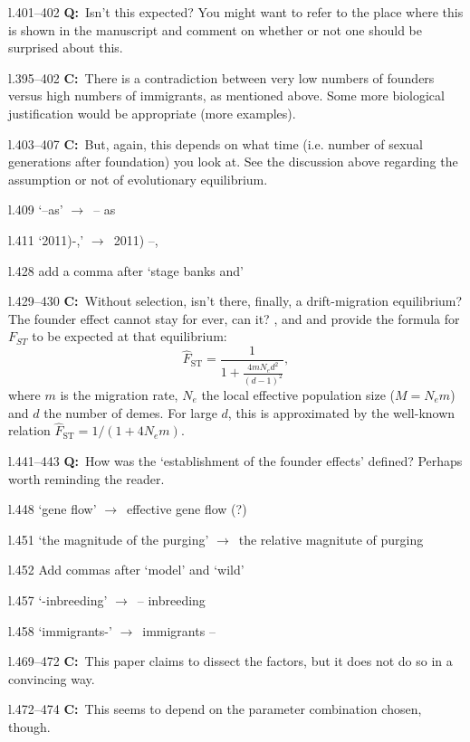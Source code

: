 \documentclass[11pt]{article}
\newenvironment{my_description}
{\begin{description}
  \setlength{\itemsep}{2pt}
  \setlength{\parskip}{0pt}
  \setlength{\parsep}{0pt}}
{\end{description}}
\newcommand{\ra}{$\rightarrow$\ }
\newcommand{\C}{\textbf{C:}\ }
\newcommand{\Q}{\textbf{Q:}\ }
\begin{document}
\begin{my_description}
	\item[l.401--402] \Q Isn't this expected? You might want to refer to the place where this is shown in the manuscript and comment on whether or not one should be surprised about this.
	\item[l.395--402] \C There is a contradiction between very low numbers of founders versus high numbers of immigrants, as mentioned above. Some more biological justification would be appropriate (more examples).
	\item[l.403--407] \C But, again, this depends on what time (i.e. number of sexual generations after foundation) you look at. See the discussion above regarding the assumption or not of evolutionary equilibrium.
	\item[l.409] `--as' \ra -- as
	\item[l.411] `2011)-,' \ra 2011) --,
	\item[l.428] add a comma after `stage banks and'
	\item[l.429--430] \C Without selection, isn't there, finally, a drift-migration equilibrium? The founder effect cannot stay for ever, can it? \citet{Takahata:1983fj}, \citet{Crow:1984kx} and \citet{Slatkin:1995kx} and provide the formula for $F_{ST}$ to be expected at that equilibrium:
	\begin{equation}
		\hat{F}_{\mathrm{ST}} = \frac{1}{1 + \frac{4mN_ed^2}{(d-1)^2}},
	\end{equation}
	where $m$ is the migration rate, $N_e$ the local effective population size ($M=N_e m$) and $d$ the number of demes. For large $d$, this is approximated by the well-known relation $\hat{F}_{\mathrm{ST}} = 1/(1+4N_em)$.
	\item[l.441--443] \Q How was the `establishment of the founder effects' defined? Perhaps worth reminding the reader.
	\item[l.448] `gene flow' \ra effective gene flow (?)
	\item[l.451] `the magnitude of the purging' \ra the relative magnitute of purging
	\item[l.452] Add commas after `model' and `wild'
	\item[l.457] `-inbreeding' \ra -- inbreeding
	\item[l.458] `immigrants-' \ra immigrants --
	\item[l.469--472] \C This paper claims to dissect the factors, but it does not do so in a convincing way.
	\item[l.472--474] \C This seems to depend on the parameter combination chosen, though.
\end{my_description}
\end{document}
